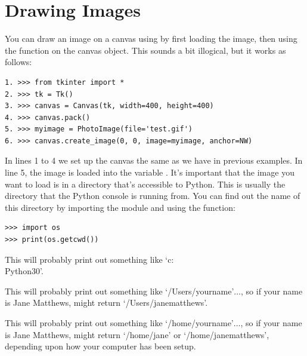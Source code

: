\section{Drawing Images}

You can draw an image on a canvas using  by first loading the image, then using the  function on the canvas object. This sounds a bit illogical, but it works as follows:

\begin{listing}
\begin{verbatim}
1. >>> from tkinter import *
2. >>> tk = Tk()
3. >>> canvas = Canvas(tk, width=400, height=400)
4. >>> canvas.pack()
5. >>> myimage = PhotoImage(file='test.gif')
6. >>> canvas.create_image(0, 0, image=myimage, anchor=NW)
\end{verbatim}
\end{listing}

In lines 1 to 4 we set up the canvas the same as we have in previous examples. In line 5, the image is loaded into the variable . It's important that the image you want to load is in a directory that's accessible to Python. This is usually the directory that the Python console is running from. You can find out the name of this directory by importing the  module and using the  function:

\begin{listing}
\begin{verbatim}
>>> import os
>>> print(os.getcwd())
\end{verbatim}
\end{listing}

\begin{WINDOWS}
This will probably print out something like `c:\\Python30'.
\end{WINDOWS}

\begin{MAC}
This will probably print out something like `/Users/yourname'$\ldots$, so if your name is Jane Matthews,  might return `/Users/janematthews'.
\end{MAC}

\begin{LINUX}
This will probably print out something like `/home/yourname'$\ldots$, so if your name is Jane Matthews,  might return `/home/jane' or `/home/janematthews', depending upon how your computer has been setup.
\end{LINUX}

